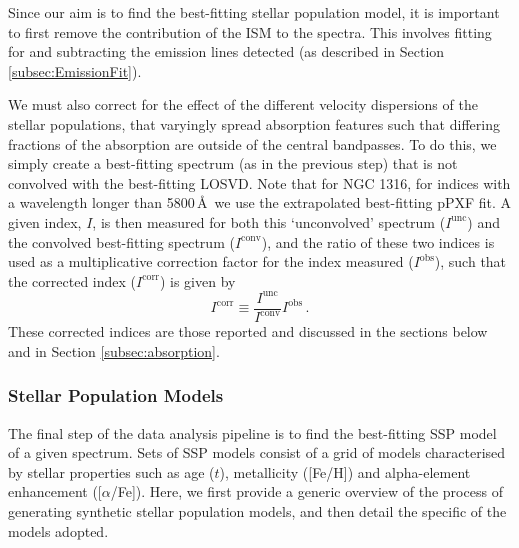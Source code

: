 			Since our aim is to find the best-fitting stellar population model, it is important to first remove the contribution of the ISM to the spectra. This involves fitting for and subtracting the emission lines detected (as described in Section \ref{subsec:EmissionFit}). 

			We must also correct for the effect of the different velocity dispersions of the stellar populations, that varyingly spread absorption features such that differing fractions of the absorption are outside of the central bandpasses. To do this, we simply create a best-fitting spectrum (as in the previous step) that is not convolved with the best-fitting LOSVD. Note that for NGC 1316, for indices with a wavelength longer than 5800\,\AA\, we use the extrapolated best-fitting pPXF fit. A given index, $I$, is then measured for both this `unconvolved' spectrum ($I^\text{unc}$) and the convolved best-fitting spectrum ($I^\text{conv}$), and the ratio of these two indices is used as a multiplicative correction factor for the index measured ($I^\text{obs}$), such that the corrected index ($I^\text{corr}$) is given by
			\begin{equation}
				I^\text{corr} \equiv \frac{I^\text{unc}}{I^\text{conv}} I^\text{obs} \, .
				\label{eq:absCorrection}
			\end{equation}
			These corrected indices are those reported and discussed in the sections below and in Section \ref{subsec:absorption}.


		\subsubsection{Stellar Population Models}
			\label{subsubsec:StellarPop}
			The final step of the data analysis pipeline is to find the best-fitting SSP model of a given spectrum. Sets of SSP models consist of a grid of models characterised by stellar properties such as age ($t$), metallicity ([Fe/H]) and alpha-element enhancement ([$\alpha$/Fe]). Here, we first provide a generic overview of the process of generating synthetic stellar population models, and then detail the specific of the models adopted. 

